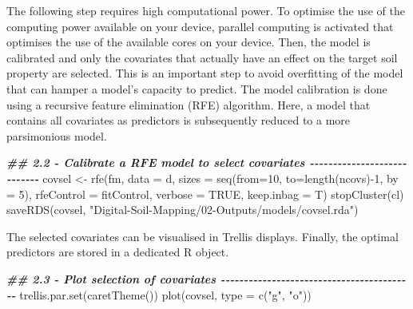 \documentclass[
  10pt,
  b5paper,
  oneside]{book}
\newenvironment{Shaded}{\begin{snugshade}}{\end{snugshade}}
\newcommand{\AttributeTok}[1]{\textcolor[rgb]{0.77,0.63,0.00}{#1}}
\newcommand{\ConstantTok}[1]{\textcolor[rgb]{0.00,0.00,0.00}{#1}}
\newcommand{\DecValTok}[1]{\textcolor[rgb]{0.00,0.00,0.81}{#1}}
\newcommand{\DocumentationTok}[1]{\textcolor[rgb]{0.56,0.35,0.01}{\textbf{\textit{#1}}}}
\newcommand{\FunctionTok}[1]{\textcolor[rgb]{0.00,0.00,0.00}{#1}}
\newcommand{\NormalTok}[1]{#1}
\newcommand{\OtherTok}[1]{\textcolor[rgb]{0.56,0.35,0.01}{#1}}
\newcommand{\SpecialCharTok}[1]{\textcolor[rgb]{0.00,0.00,0.00}{#1}}
\newcommand{\StringTok}[1]{\textcolor[rgb]{0.31,0.60,0.02}{#1}}
\begin{document}
The following step requires high computational power. To optimise the use of the computing power available on your device, parallel computing is activated that optimises the use of the available cores on your device. Then, the model is calibrated and only the covariates that actually have an effect on the target soil property are selected. This is an important step to avoid overfitting of the model that can hamper a model's capacity to predict.
The model calibration is done using a recursive feature elimination (RFE) algorithm. Here, a model that contains all covariates as predictors is subsequently reduced to a more parsimonious model.

\begin{Shaded}
\begin{Highlighting}[]
\DocumentationTok{\#\# 2.2 {-} Calibrate a RFE model to select covariates {-}{-}{-}{-}{-}{-}{-}{-}{-}{-}{-}{-}{-}{-}{-}{-}{-}{-}{-}{-}{-}{-}{-}{-}{-}{-}{-}{-}}
\NormalTok{covsel }\OtherTok{\textless{}{-}} \FunctionTok{rfe}\NormalTok{(fm,}
              \AttributeTok{data =}\NormalTok{ d,  }
              \AttributeTok{sizes =} \FunctionTok{seq}\NormalTok{(}\AttributeTok{from=}\DecValTok{10}\NormalTok{, }\AttributeTok{to=}\FunctionTok{length}\NormalTok{(ncovs)}\SpecialCharTok{{-}}\DecValTok{1}\NormalTok{, }\AttributeTok{by =} \DecValTok{5}\NormalTok{),}
              \AttributeTok{rfeControl =}\NormalTok{ fitControl,}
              \AttributeTok{verbose =} \ConstantTok{TRUE}\NormalTok{,}
              \AttributeTok{keep.inbag =}\NormalTok{ T)}
\FunctionTok{stopCluster}\NormalTok{(cl)}
\FunctionTok{saveRDS}\NormalTok{(covsel, }\StringTok{"Digital{-}Soil{-}Mapping/02{-}Outputs/models/covsel.rda"}\NormalTok{)}
\end{Highlighting}
\end{Shaded}

The selected covariates can be visualised in Trellis displays. Finally, the optimal predictors are stored in a dedicated R object.

\begin{Shaded}
\begin{Highlighting}[]
\DocumentationTok{\#\# 2.3 {-} Plot selection of covariates {-}{-}{-}{-}{-}{-}{-}{-}{-}{-}{-}{-}{-}{-}{-}{-}{-}{-}{-}{-}{-}{-}{-}{-}{-}{-}{-}{-}{-}{-}{-}{-}{-}{-}{-}{-}{-}{-}{-}{-}{-}{-}}
\FunctionTok{trellis.par.set}\NormalTok{(}\FunctionTok{caretTheme}\NormalTok{())}
\FunctionTok{plot}\NormalTok{(covsel, }\AttributeTok{type =} \FunctionTok{c}\NormalTok{(}\StringTok{"g"}\NormalTok{, }\StringTok{"o"}\NormalTok{))}
\end{Highlighting}
\end{Shaded}
\end{document}
